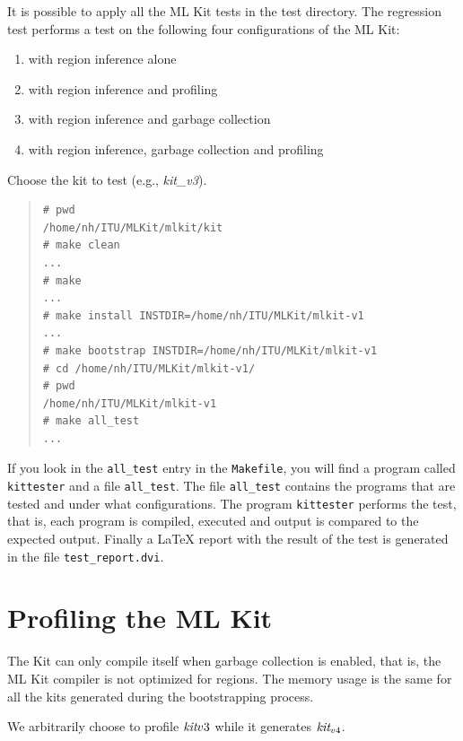 \documentclass[12pt]{book}
\begin{document}
It is possible to apply all the ML Kit tests in the test directory.
The regression test performs a test on the following four
configurations of the ML Kit:

\begin{enumerate}
\item with region inference alone
\item with region inference and profiling
\item with region inference and garbage collection
\item with region inference, garbage collection and profiling
\end{enumerate}

Choose the kit to test (e.g., \emph{kit\_v3}).

\begin{quote}
\begin{verbatim}
# pwd
/home/nh/ITU/MLKit/mlkit/kit
# make clean
...
# make
...
# make install INSTDIR=/home/nh/ITU/MLKit/mlkit-v1
...
# make bootstrap INSTDIR=/home/nh/ITU/MLKit/mlkit-v1
# cd /home/nh/ITU/MLKit/mlkit-v1/
# pwd
/home/nh/ITU/MLKit/mlkit-v1
# make all_test
...
\end{verbatim}
\end{quote}

If you look in the \texttt{all\_test} entry in the {\tt Makefile}, you will
find a program called \texttt{kittester} and a file
\texttt{all\_test}. The file \texttt{all\_test} contains the programs
that are tested and under what configurations. The program
\texttt{kittester} performs the test, that is, each program is
compiled, executed and output is compared to the expected output.
Finally a \LaTeX{} report with the result of the test is generated in
the file \texttt{test\_report.dvi}.

\section{Profiling the ML Kit}

The Kit can only compile itself when garbage collection is enabled,
that is, the ML Kit compiler is not optimized for regions. The memory
usage is the same for all the kits generated during the bootstrapping
process.

We arbitrarily choose to profile $\emph{kit}{v3}$ while it generates
$\emph{kit}_{v4}$.

\begin{verbatim}
\end{verbatim}
\end{document}
